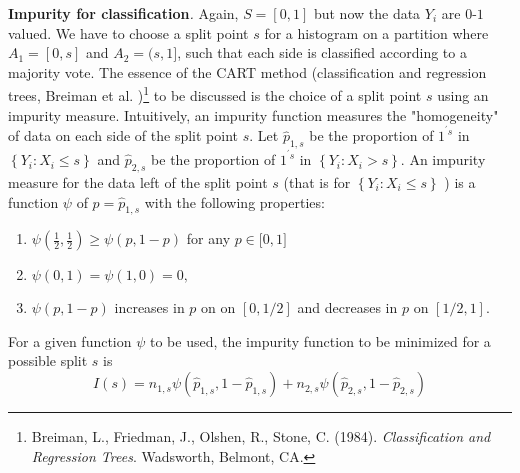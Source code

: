 \documentclass[11pt,twoside]{article}%
\theoremstyle{change}
\begin{document}
\bigskip

\textbf{Impurity for classification}\textit{.} Again, $S=[0,1]$ but now the
data $Y_{i}$ are $0$-$1$ valued. We have to choose a split point $s$ for a
histogram on a partition where $A_{1}=[0,s]$ and $A_{2}=(s,1]$, such that each
side is classified according to a majority vote. The essence of the CART
method (classification and regression trees, Breiman et al. \cite{BFOS}%
)\footnote{Breiman, L., Friedman, J., Olshen, R., Stone, C. (1984).
\textsl{Classification and Regression Trees}. Wadsworth, Belmont, CA.} to be
discussed is the choice of a split point $s$ using an impurity measure.
Intuitively, an impurity function measures the "homogeneity" of data on each
side of the split point $s$. Let $\hat{p}_{1,s}$ be the proportion of
$1^{^{\prime}s}$ in $\left\{  Y_{i}:X_{i}\leq s\right\}  $ and $\hat{p}_{2,s}$
be the proportion of $1^{^{\prime}s}$ in $\left\{  Y_{i}:X_{i}>s\right\}  $.
An impurity measure for the data left of the split point $s$ (that is for
$\left\{  Y_{i}:X_{i}\leq s\right\}  $ ) is a function $\psi$ of $p=\hat
{p}_{1,s}$ with the following properties:

\begin{enumerate}
\item $\psi\left(  \frac{1}{2},\frac{1}{2}\right)  \geq\psi\left(
p,1-p\right)  $ for any $p\in\lbrack0,1]$

\item $\psi\left(  0,1\right)  =\psi\left(  1,0\right)  =0,$

\item $\psi\left(  p,1-p\right)  $ increases in $p$ on on $[0,1/2]$ and
decreases in $p$ on $[1/2,1].$
\end{enumerate}

For a given function $\psi$ to be used, the impurity function to be minimized
for a possible split $s$ is
\begin{equation}
I(s)=n_{1,s}\psi\left(  \hat{p}_{1,s},1-\hat{p}_{1,s}\right)  +n_{2,s}%
\psi\left(  \hat{p}_{2,s},1-\hat{p}_{2,s}\right) \label{impurity-criterion}%
\end{equation}
\end{document}
